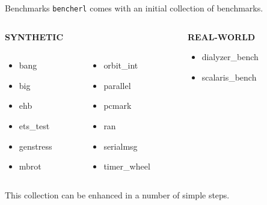 \documentclass{beamer}
\begin{document}
\begin{frame}[t]{Benchmarks}
	\texttt{bencherl} comes with an initial collection of benchmarks.
    \vspace{10pt}
	\begin{columns}[t]
		\begin{column}{0.45\textwidth}
			\begin{center}
			{\bf SYNTHETIC}
			\begin{columns}
				\begin{column}{0.45\textwidth}
					\begin{itemize}
						\item[] bang
						\item[] big
						\item[] ehb
						\item[] ets\_test
						\item[] genstress
						\item[] mbrot
					\end{itemize}
				\end{column}
				\begin{column}{0.45\textwidth}
					\begin{itemize}
						\item[] orbit\_int
						\item[] parallel
						\item[] pcmark
						\item[] ran
						\item[] serialmsg
						\item[] timer\_wheel
					\end{itemize}
				\end{column}
			\end{columns}
			\end{center}	
		\end{column}
        \begin{column}{0.45\textwidth}
			\begin{center}	
			{\bf REAL-WORLD}
			\begin{itemize}
				\item[] dialyzer\_bench
				\item[] scalaris\_bench
			\end{itemize}
			\end{center}
        \end{column}
	\end{columns}	
	\vspace{10pt}
	This collection can be enhanced in a number of simple steps.
\end{frame}
\end{document}
